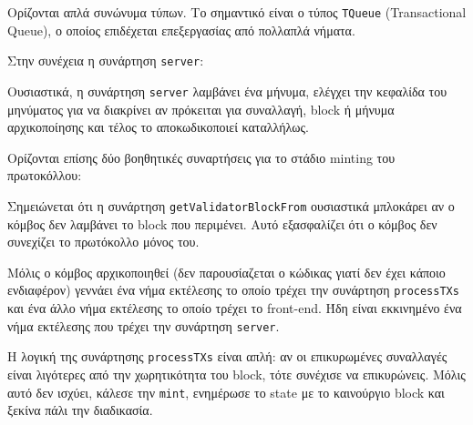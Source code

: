 \documentclass{article}
\newcommand{\eng}[1]{\foreignlanguage{english}{#1}} %
\begin{document}
    

Ορίζονται απλά συνώνυμα τύπων. Το σημαντικό είναι ο τύπος \texttt{\eng{TQueue}}
(\eng{Transactional Queue}), ο οποίος επιδέχεται επεξεργασίας από πολλαπλά νήματα.

Στην συνέχεια η συνάρτηση \texttt{\eng{server}}:

    

Ουσιαστικά, η συνάρτηση \texttt{\eng{server}} λαμβάνει ένα μήνυμα, ελέγχει την κεφαλίδα
του μηνύματος για να διακρίνει αν πρόκειται για συναλλαγή, \eng{block} ή μήνυμα
αρχικοποίησης και τέλος το αποκωδικοποιεί καταλλήλως.

Ορίζονται επίσης δύο βοηθητικές συναρτήσεις για το στάδιο \eng{minting} του
πρωτοκόλλου:

    

Σημειώνεται ότι η συνάρτηση \texttt{\eng{getValidatorBlockFrom}} ουσιαστικά μπλοκάρει
αν ο κόμβος δεν λαμβάνει το \eng{block} που περιμένει. Αυτό εξασφαλίζει ότι ο κόμβος
δεν συνεχίζει το πρωτόκολλο μόνος του.

Μόλις ο κόμβος αρχικοποιηθεί (δεν παρουσίαζεται ο κώδικας γιατί δεν έχει κάποιο ενδιαφέρον)
γεννάει ένα νήμα εκτέλεσης το οποίο τρέχει την συνάρτηση \texttt{\eng{processTXs}} και
ένα άλλο νήμα εκτέλεσης το οποίο τρέχει το \eng{front-end}. Ήδη είναι εκκινημένο ένα
νήμα εκτέλεσης που τρέχει την συνάρτηση \texttt{\eng{server}}.



Η λογική της συνάρτησης \texttt{\eng{processTXs}} είναι απλή: αν οι επικυρωμένες
συναλλαγές είναι λιγότερες από την χωρητικότητα του \eng{block}, τότε συνέχισε
να επικυρώνεις. Μόλις αυτό δεν ισχύει, κάλεσε την \texttt{\eng{mint}}, ενημέρωσε
το \eng{state} με το καινούργιο \eng{block} και ξεκίνα πάλι την διαδικασία.
\end{document}
